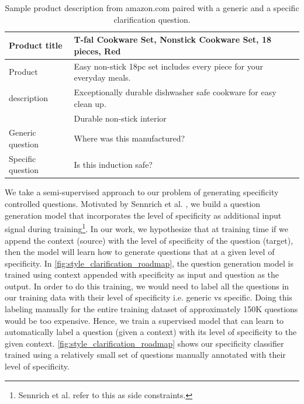 \documentclass[11pt,a4paper]{article}
\begin{document}
\begin{table}[t]
\centering
\begin{tabular}{l | l}
\toprule
Product title & T-fal Cookware Set, Nonstick Cookware Set, 18 pieces, Red \\
\midrule
Product & Easy non-stick 18pc set includes every piece for your everyday meals. \\
description & Exceptionally durable dishwasher safe cookware for easy clean up.\\
& Durable non-stick interior\\
\midrule
Generic question & Where was this manufactured?\\
\midrule
Specific question & Is this induction safe?\\
\bottomrule
\end{tabular}
\caption{Sample product description from amazon.com paired with a generic and a specific clarification question.}\label{tab:specificity-classifier-results}
\end{table}


We take a semi-supervised approach to our problem of generating specificity controlled questions. Motivated by Sennrich et al. \cite{sennrich2016controlling}, we build a question generation model that incorporates the level of specificity as additional input signal during training\footnote{Sennrich et al. \cite{sennrich2016controlling} refer to this as side constraints.}. In our work, we hypothesize that at training time if we append the context (source) with the level of specificity of the question (target), then the model will learn how to generate questions that at a given level of specificity. In \autoref{fig:style_clarification_roadmap}, the question generation model is trained using context appended with specificity as input and question as the output. In order to do this training, we would need to label all the questions in our training data with their level of specificity i.e. generic vs specific. Doing this labeling manually for the entire training dataset of approximately 150K questions would be too expensive. Hence, we train a supervised model that can learn to automatically label a question (given a context) with its level of specificity to the given context. \autoref{fig:style_clarification_roadmap} shows our specificity classifier trained using a relatively small set of questions manually annotated with their level of specificity. 
\end{document}
